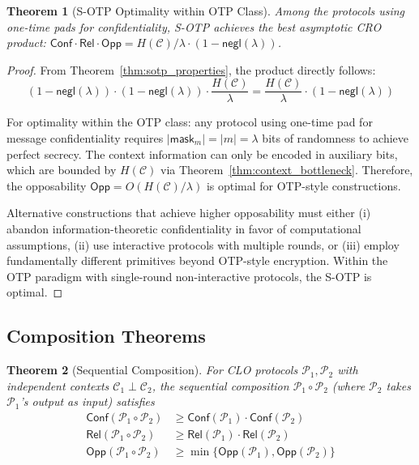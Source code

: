 \documentclass{ieeeaccess}
\newtheorem{theorem}{Theorem}[subsection]
\newtheorem{proof}{Proof}[section]
\begin{document}
\begin{theorem}[S-OTP Optimality within OTP Class]\label{thm:sotp_optimal}
Among the protocols using one-time pads for confidentiality, S-OTP achieves the best asymptotic CRO product: $\mathsf{Conf} \cdot \mathsf{Rel} \cdot \mathsf{Opp} = H(\mathcal{C})/\lambda \cdot (1 - \mathsf{negl}(\lambda))$.
\end{theorem}

\begin{proof}
From Theorem~\ref{thm:sotp_properties}, the product directly follows:
\begin{equation}
(1 - \mathsf{negl}(\lambda)) \cdot (1 - \mathsf{negl}(\lambda)) \cdot \frac{H(\mathcal{C})}{\lambda} = \frac{H(\mathcal{C})}{\lambda} \cdot (1 - \mathsf{negl}(\lambda))
\end{equation}

For optimality within the OTP class: any protocol using one-time pad for message confidentiality requires $|\mathsf{mask}_m| = |m| = \lambda$ bits of randomness to achieve perfect secrecy. The context information can only be encoded in auxiliary bits, which are bounded by $H(\mathcal{C})$ via Theorem~\ref{thm:context_bottleneck}. Therefore, the opposability $\mathsf{Opp} = O(H(\mathcal{C})/\lambda)$ is optimal for OTP-style constructions.

Alternative constructions that achieve higher opposability must either (i) abandon information-theoretic confidentiality in favor of computational assumptions, (ii) use interactive protocols with multiple rounds, or (iii) employ fundamentally different primitives beyond OTP-style encryption. Within the OTP paradigm with single-round non-interactive protocols, the S-OTP is optimal.
\end{proof}

\subsection{Composition Theorems}

\begin{theorem}[Sequential Composition]\label{thm:sequential_composition}
For CLO protocols $\mathcal{P}_1, \mathcal{P}_2$ with independent contexts $\mathcal{C}_1 \perp \mathcal{C}_2$, the sequential composition $\mathcal{P}_1 \circ \mathcal{P}_2$ (where $\mathcal{P}_2$ takes $\mathcal{P}_1$'s output as input) satisfies
\begin{align}
\mathsf{Conf}(\mathcal{P}_1 \circ \mathcal{P}_2) &\geq \mathsf{Conf}(\mathcal{P}_1) \cdot \mathsf{Conf}(\mathcal{P}_2) \\
\mathsf{Rel}(\mathcal{P}_1 \circ \mathcal{P}_2) &\geq \mathsf{Rel}(\mathcal{P}_1) \cdot \mathsf{Rel}(\mathcal{P}_2) \\
\mathsf{Opp}(\mathcal{P}_1 \circ \mathcal{P}_2) &\geq \min\{\mathsf{Opp}(\mathcal{P}_1), \mathsf{Opp}(\mathcal{P}_2)\}
\end{align}
\end{theorem}
\end{document}
